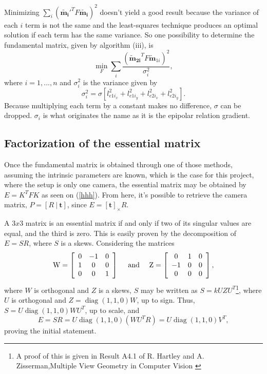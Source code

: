 Minimizing $ \sum_i (\mathbf{\widetilde{m_i}}'^T F \mathbf{\widetilde{m_i}})^2$ doesn't yield a good result because the variance of each $i$ term is not the same and the least-squares technique produces an optimal solution if each term has the same variance.
So one possibility to determine the fundamental matrix, given by algorithm (iii), is
\begin{equation}
\min_F \sum_i \frac{ (\mathbf{\widetilde{\mathbf{m}}_{2i}}^T F \widetilde{\mathbf{m}}_{1i})^2}{\sigma_i^2},
\end{equation}
where $i=1,...,n$ and $\sigma_i^2$ is the variance given by 
\begin{equation}
\sigma_i^2 = \sigma [l_{{e1i}_x}^2 + l_{{e1i}_y}^2 + l_{{e2i}_x}^2 + l_{{e2i}_y}^2].
\end{equation}
Because multiplying each term by a constant makes no difference, $\sigma$ can be dropped. $\sigma_i$ is what originates the name as it is the  epipolar relation gradient.

\subsection{Factorization of the essential matrix}

Once the fundamental matrix is obtained through one of those methods, assuming the intrinsic parameters are known, which is the case for this project, where the setup is only one camera, the essential matrix may be obtained by $E = K^{T}  F K$ as seen on (\ref{hhh}).
From here, it's possible to retrieve the camera matrix, $P = [R \ | \ \mathbf{t}]$, since $E = [\mathbf{t}]_\times R$. 

A $3x3$ matrix is an essential matrix if and only if two of its singular values are equal, and the third is zero. This is easily proven by the decomposition of $E = SR$, where $S$ is a \gls{skews}.
Considering the matrices 
\begin{equation}
\mathrm { W } = \left[ \begin{array} { c c c } { 0 } & { - 1 } & { 0 } \\ { 1 } & { 0 } & { 0 } \\ { 0 } & { 0 } & { 1 } \end{array} \right] \quad \text { and } \quad \mathrm { Z } = \left[ \begin{array} { c c c } { 0 } & { 1 } & { 0 } \\ { - 1 } & { 0 } & { 0 } \\ { 0 } & { 0 } & { 0 } \end{array} \right],
\end{equation}
where $W$ is orthogonal and $Z$ is a \gls{skews}, $S$ may be written as $S = kUZU^T$\footnote{A proof of this is given in Result A4.1 of R. Hartley and A. Zisserman,Multiple View Geometry in Computer Vision \cite{multiview}}, where $U$ is orthogonal and $Z = \operatorname{diag}(1,1,0)W$, up to sign. Thus, $S = U \operatorname { diag } ( 1,1,0 ) WU^T$, up to scale, and 
\begin{equation}
E = SR = U \operatorname { diag } ( 1,1,0 ) \left( WU^T R \right) = U \operatorname { diag } ( 1,1,0 ) V^T,
\end{equation}
proving the initial statement.

